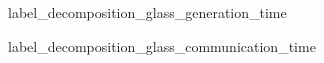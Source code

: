 \documentclass[conference,compsoc]{IEEEtran}
\begin{document}
\begin{figure}[htbp]%
	\centering
	\caption{label\_decomposition\_glass\_generation\_time}
\end{figure}

\begin{figure}[htbp]%
	\centering
	\caption{label\_decomposition\_glass\_communication\_time}
\end{figure}
\end{document}
